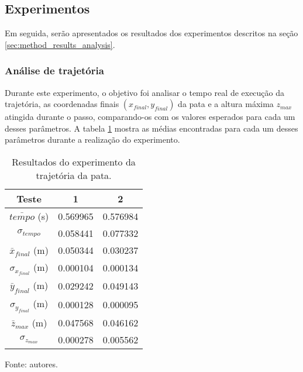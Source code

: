 \documentclass[../main.tex]{subfiles}
\begin{document}
  \subsection{Experimentos}
  Em seguida, serão apresentados os resultados dos experimentos descritos na seção \ref{sec:method_results_analysis}.

  \subsubsection{Análise de trajetória}
  Durante este experimento, o objetivo foi analisar o tempo real de execução da trajetória, as coordenadas finais $(x_{final}, y_{final})$ da pata e a altura máxima $z_{max}$ atingida durante o passo, comparando-os com os valores esperados para cada um desses parâmetros. A tabela \ref{tab:trajetoria} mostra as médias encontradas para cada um desses parâmetros durante a realização do experimento.

  \begin{table}[!htb]
    \caption{Resultados do experimento da trajetória da pata.}
    \centering
    \begin{tabular}{ccc}
      \hline
      Teste & 1         & 2        \\
      \hline
      $\bar{tempo}$ (s)          & 0.569965  & 0.576984 \\
      \hline
      $\sigma_{tempo}$            & 0.058441  & 0.077332 \\
      \hline
      $\bar{x}_{final}$ (m)     & 0.050344  & 0.030237 \\
      \hline
      $\sigma_{x_{final}}$ (m)  & 0.000104  & 0.000134 \\
      \hline
      $\bar{y}_{final}$ (m)     & 0.029242  & 0.049143 \\      
      \hline
      $\sigma_{y_{final}}$ (m)  & 0.000128  & 0.000095 \\      
      \hline
      $\bar{z}_{max}$ (m)       & 0.047568  & 0.046162 \\      
      \hline
      $\sigma_{z_{max}}$    & 0.000278  & 0.005562 \\
      \hline   
    \end{tabular}

    Fonte: autores.
    \label{tab:trajetoria}
  \end{table}
\end{document}
